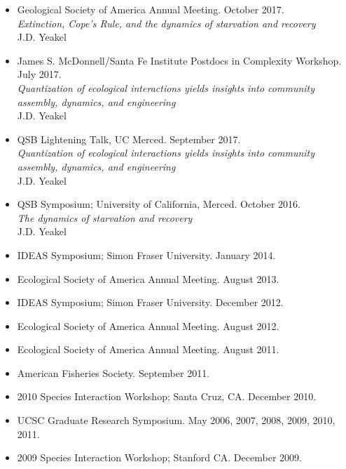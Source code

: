 \documentclass[margin,line,12pt]{res}
\begin{document}
\begin{resume}
\begin{itemize}
\item Geological Society of America Annual Meeting. October 2017.\\
\emph{Extinction, Cope's Rule, and the dynamics of starvation and recovery}\\
J.D. Yeakel

\item James S. McDonnell/Santa Fe Institute Postdocs in Complexity Workshop. July 2017.\\
\emph{Quantization of ecological interactions yields insights into community assembly, dynamics, and engineering}\\
J.D. Yeakel

\item QSB Lightening Talk, UC Merced. September 2017.\\
\emph{Quantization of ecological interactions yields insights into community assembly, dynamics, and engineering}\\
J.D. Yeakel

\item QSB Symposium; University of California, Merced. October 2016.\\
\emph{The dynamics of starvation and recovery}\\
J.D. Yeakel

\item IDEAS Symposium; Simon Fraser University. January 2014.

\item Ecological Society of America Annual Meeting. August 2013.

\item IDEAS Symposium; Simon Fraser University. December 2012.

\item Ecological Society of America Annual Meeting. August 2012.

\item Ecological Society of America Annual Meeting. August 2011.

\item American Fisheries Society. September 2011.

\item 2010 Species Interaction Workshop; Santa Cruz, CA. December 2010.

\item UCSC Graduate Research Symposium. May 2006, 2007, 2008, 2009, 2010, 2011.

\item 2009 Species Interaction Workshop; Stanford CA. December 2009.


\end{itemize}
\end{resume}
\end{document}
